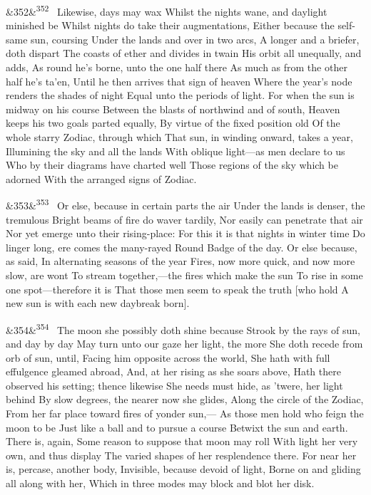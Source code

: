 \documentclass[12pt]{article}
\newcommand{\para}[1][]{\par\noindent\ifx&#1&\else\textsuperscript{\footnotesize #1}~\fi}
\begin{document}
\para[352] Likewise, days may wax Whilst the nights wane, and daylight minished be Whilst nights do take their augmentations, Either because the self-same sun, coursing Under the lands and over in two arcs, A longer and a briefer, doth dispart The coasts of ether and divides in twain His orbit all unequally, and adds, As round he's borne, unto the one half there As much as from the other half he's ta'en, Until he then arrives that sign of heaven Where the year's node renders the shades of night Equal unto the periods of light. For when the sun is midway on his course Between the blasts of northwind and of south, Heaven keeps his two goals parted equally, By virtue of the fixed position old Of the whole starry Zodiac, through which That sun, in winding onward, takes a year, Illumining the sky and all the lands With oblique light---as men declare to us Who by their diagrams have charted well Those regions of the sky which be adorned With the arranged signs of Zodiac.

\para[353] Or else, because in certain parts the air Under the lands is denser, the tremulous Bright beams of fire do waver tardily, Nor easily can penetrate that air Nor yet emerge unto their rising-place: For this it is that nights in winter time Do linger long, ere comes the many-rayed Round Badge of the day. Or else because, as said, In alternating seasons of the year Fires, now more quick, and now more slow, are wont To stream together,---the fires which make the sun To rise in some one spot---therefore it is That those men seem to speak the truth [who hold A new sun is with each new daybreak born].

\para[354] The moon she possibly doth shine because Strook by the rays of sun, and day by day May turn unto our gaze her light, the more She doth recede from orb of sun, until, Facing him opposite across the world, She hath with full effulgence gleamed abroad, And, at her rising as she soars above, Hath there observed his setting; thence likewise She needs must hide, as 'twere, her light behind By slow degrees, the nearer now she glides, Along the circle of the Zodiac, From her far place toward fires of yonder sun,--- As those men hold who feign the moon to be Just like a ball and to pursue a course Betwixt the sun and earth. There is, again, Some reason to suppose that moon may roll With light her very own, and thus display The varied shapes of her resplendence there. For near her is, percase, another body, Invisible, because devoid of light, Borne on and gliding all along with her, Which in three modes may block and blot her disk.
\end{document}
